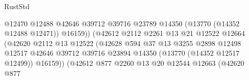 \begin{lexlean}{RustStd}
\begin{coremodule}
                                                    @12470
                                                    @12488
                                                    @42646
                                                    @39712
                                                    @39716
                                                    @23789
                                                    @14350
                                                    (@13770 (@14352 @12488 @12471))
                                                    @16159))
                                                (@42612
                                                  @2112
                                                  @2261
                                                  @13
                                                  @21
                                                  @12522
                                                  @12664
                                                  (@42620
                                                    @2112
                                                    @13
                                                    @12522
                                                    (@42628
                                                      @594
                                                      @37
                                                      @13
                                                      @3255
                                                      @2898
                                                      @12498
                                                      @12517
                                                      @42646
                                                      @39712
                                                      @39716
                                                      @23894
                                                      @14350
                                                      (@13770 (@14352 @12517 @12499))
                                                      @16159))
                                                  (@42612
                                                    @877
                                                    @2260
                                                    @13
                                                    @20
                                                    @12544
                                                    @12663
                                                    (@42620
                                                      @877

\end{coremodule}
\end{lexlean}
